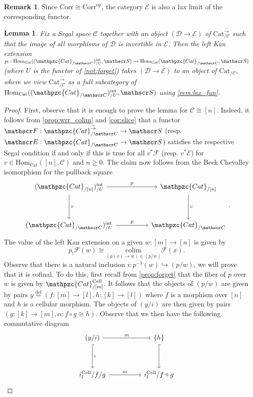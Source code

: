\documentclass[a4paper, reqno]{amsart}
\newtheorem{lemma}[theorem]{Lemma}
\theoremstyle{definition}
\newtheorem{remark}[theorem]{Remark}
\newcommand\cC{\mathscr C}
\newcommand\cD{\mathscr D}
\newcommand\cE{\mathscr E}
\newcommand\cF{\mathscr F}
\newcommand\cS{\mathscr S}
\newcommand\mor{\mathrm{Hom}}
\newcommand\op{\mathrm{op}}
\newcommand\cat{\mathrm{Cat}}
\newcommand\ccat{\mathpzc{Cat}}
\newcommand\colim{\mathrm{colim}}
\newcommand\bydef{\overset{\mathrm{def}}{=}}
\newcommand\corr{\mathrm{Corr}}
\newcommand\cell{\mathrm{Cell}}
\newcommand\wrr{{\overset{\sim}{\rightarrow}}}
\newcommand\inrt{\mathrm{int}}
\begin{document}
\begin{remark}
Since $\corr\cong\corr^\op$, the category $\cE$ is also a lax limit of the corresponding functor.
\end{remark}
\begin{lemma}\label{lem:fact_cat}
Fix a Segal space $\cC$ together with an object $(\cD\rightarrow\cE)$ of $\cat^\wrr_{/\cC}$ such that the image of all morphisms of $\cD$ is invertible in $\cE$. Then the left Kan extension $p_!:\mor_\cat((\ccat_{/\cC})^\inrt_{/U},\cS)\rightarrow\mor_\cat(\ccat_{/\cC},\cS)$ (where $U$ is the functor of \cref{not:forget}) takes $(\cD\rightarrow\cE)$ to an object of $\cat_{/\cC}$, where we view $\cat^\wrr_{/\cC}$ as a full subcategory of $\mor_\cat((\ccat_{/\cC})^\inrt_{/U},\cS)$ using \cref{rem:lax_fun}.
\end{lemma}
\begin{proof}
First, observe that it is enough to prove the lemma for $\cC\cong[n]$. Indeed, it follows from \cref{prop:wrr_colim} and \cref{cor:slice} that a functor $\cF:\ccat^\wrr_{/\cC}\rightarrow\cS$ (resp. $\cE:\ccat_{/\cC}\rightarrow\cS$) satisfies the respective Segal condition if and only if this is true for all $v^*\cF$ (resp. $v^*\cE$) for $v\in\mor_\cat([n],\cC)$ and $n\geq0$. The claim now follows from the Beck Chevalley isomorphism for the pullback square
\[
\begin{tikzcd}[row sep=huge, column sep=huge]
(\ccat_{/[n]})^\inrt_{/U}\arrow[d, "v"]\arrow[r, "p"]&\ccat_{/[n]}\arrow[d, "v"]\\
(\ccat_{/\cC})^\inrt_{/U}\arrow[r, "p"]&\ccat_{/\cC}
\end{tikzcd}.
\]
The value of the left Kan extension on a given $w:[m]\rightarrow[n]$ is given by 
\[p_!\cF(w)\cong\underset{(p(x)\rightarrow w)\in(p/w)}{\colim}\cF(x).\]
Observe that there is a natural inclusion $i:p^{-1}(w)\hookrightarrow(p/w)$, we will prove that it is cofinal. To do this, first recall from \cref{prop:forget} that the fiber of $p$ over $w$ is given by $\ccat^\cell_{/[m]}$. It follows that the objects of $(p/w)$ are given by pairs $y\bydef(f:[m]\rightarrow[l],h:[k]\rightarrow[l])$ where $f$ is a morphism over $[n]$ and $h$ is a cellular morphism. The objects of $(y/i)$ are then given by pairs $(g:[k]\rightarrow[m], \alpha:f\circ g\cong h)$. Observe that we then have the following commutative diagram 
\[
\begin{tikzcd}[row sep=huge, column sep=huge]
(y/i)\arrow[r, "m"]\arrow[d, hook, "i"]&\{h\}\arrow[d, hook]\\
i^\cell_l/f/g\arrow[r, "m"]&i^\cell_l/f\circ g

\end{tikzcd}\]
\end{proof}
\end{document}
